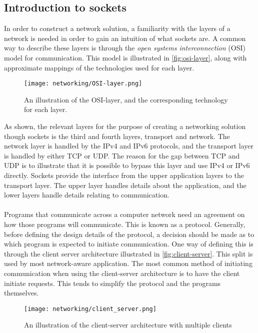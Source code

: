 \subsection{Introduction to sockets}
In order to construct a network solution, a familiarity with the layers of a network is needed in order to gain an intuition of what sockets are.
A common way to describe these layers is through the \textit{open systems interconnection} (OSI) model for communication.
This model is illustrated in \autoref{fig:osi-layer}, along with approximate mappings of the technologies used for each layer.
\begin{figure}[H]
    \centering
    \texttt{[image: networking/OSI-layer.png]}
    \caption{An illustration of the OSI-layer, and the corresponding technology for each layer.}
    \label{fig:osi-layer}
\end{figure}
As shown, the relevant layers for the purpose of creating a networking solution though sockets is the third and fourth layers, transport and network.
The network layer is handled by the IPv4 and IPv6 protocols, and the transport layer is handled by either TCP or UDP.
The reason for the gap between TCP and UDP is to illustrate that it is possible to bypass this layer and use IPv4 or IPv6 directly\cite{socketnetworking}.
Sockets provide the interface from the upper application layers to the transport layer.
The upper layer handles details about the application, and the lower layers handle details relating to communication.
\\\\
Programs that communicate across a computer network need an agreement on how those programs will communicate.
This is known as a protocol.
Generally, before defining the design details of the protocol, a decision should be made as to which program is expected to initiate communication.
One way of defining this is through the client server architecture illustrated in \autoref{fig:client-server}.
This split is used by most network-aware application\cite{socketnetworking}.
The most common method of initiating communication when using the client-server architecture is to have the client initiate requests.
This tends to simplify the protocol and the programs themselves\cite{socketnetworking}.

\begin{figure}[H]
    \centering
    \texttt{[image: networking/client\_server.png]}
    \caption{An illustration of the client-server architecture with multiple clients}
    \label{fig:client-server}
\end{figure}


